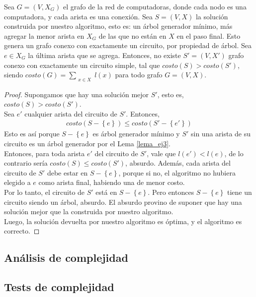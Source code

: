 \begin{correctidud}
Sea $G = (V,X_G)$ el grafo de la red de computadoras, donde cada nodo es una computadora, y cada arista es una conexión. Sea $S = (V,X)$ la solución construida por nuestro algoritmo, esto es: un árbol generador mínimo, más agregar la menor arista en $X_G$ de las que no están en $X$ en el paso final. Esto genera un grafo conexo con exactamente un circuito, por propiedad de árbol. Sea $e \in X_G$ la última arista que se agrega. Entonces, no existe $S' = (V,X')$ grafo conexo con exactamente un circuito simple, tal que $costo(S) > costo(S')$, siendo $costo(G) = \sum\limits_{\substack{x \in X}} l(x)$ para todo grafo $G = (V,X)$.
\end{correctidud}
\begin{proof}
Supongamos que hay una solución mejor $S'$, esto es, $costo(S) > costo(S')$. \\
\noindent Sea $e'$ cualquier arista del circuito de $S'$. Entonces,
\begin{align*}
costo(S - \left\{e\right\}) \leq costo(S' - \left\{e'\right\})
\end{align*}
Esto es así porque $S - \left\{e\right\}$ es árbol generador mínimo y $S'$ sin una arista de su circuito es un árbol generador por el Lema \ref{lema_ej3}. \\
Entonces, para toda arista $e'$ del circuito de $S'$, vale que $l(e') < l(e)$, de lo contrario sería $costo(S) \leq costo(S')$, absurdo.
Además, cada arista del circuito de $S'$ debe estar en $S - \left\{e\right\}$, porque si no, el algoritmo no hubiera elegido a $e$ como arista final, habiendo una de menor costo. \\
Por lo tanto, el circuito de $S'$ está en $S - \left\{e\right\}$. Pero entonces $S - \left\{e\right\}$ tiene un circuito siendo un árbol, absurdo. El absurdo provino de suponer que hay una solución mejor que la construida por nuestro algoritmo. \\
Luego, la solución devuelta por nuestro algoritmo es óptima, y el algoritmo es correcto.
\end{proof}

\subsection{Análisis de complejidad}

\subsection{Tests de complejidad}
